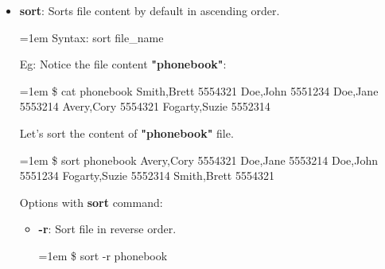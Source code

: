 \begin{flushleft}
\begin{itemize}
		\item \textbf{sort}: Sorts file content by default in ascending order.
		\bigskip
		\begin{tcolorbox}[breakable,notitle,boxrule=-0pt,colback=pink,colframe=pink]
			\color{black}
			\font=1em
			Syntax: sort file\_name
			\font=4pt
		\end{tcolorbox}
		Eg: Notice the file content \textbf{"phonebook"}:
		\bigskip
		\begin{tcolorbox}[breakable,notitle,boxrule=-0pt,colback=black,colframe=black]
			\color{green}
			\font=1em
			\$ cat phonebook
			\color{white}
			\newline
			Smith,Brett 5554321
			\newline
			Doe,John 5551234
			\newline
			Doe,Jane 5553214
			\newline
			Avery,Cory 5554321
			\newline
			Fogarty,Suzie 5552314
			\font=4pt
		\end{tcolorbox}		
		Let's sort the content of \textbf{"phonebook"} file.
		\bigskip
		\begin{tcolorbox}[breakable,notitle,boxrule=-0pt,colback=black,colframe=black]
			\color{green}
			\font=1em
			\$ sort phonebook
			\color{white}
			\newline
			Avery,Cory 5554321
			\newline
			\color{white}
			Doe,Jane 5553214
			\newline
			\color{white}
			Doe,John 5551234
			\newline
			Fogarty,Suzie 5552314
			\newline
			Smith,Brett 5554321
			\font=4pt
		\end{tcolorbox}		
		Options with \textbf{sort} command:
		\begin{itemize}
			\item \textbf{-r}: Sort file in reverse order.
			\bigskip
			\begin{tcolorbox}[breakable,notitle,boxrule=-0pt,colback=black,colframe=black]
				\color{green}
				\font=1em
				\$ sort -r phonebook
				\font=4pt
			\end{tcolorbox}		
		\end{itemize}

		\bigskip
		\bigskip


\end{itemize}
\end{flushleft}
